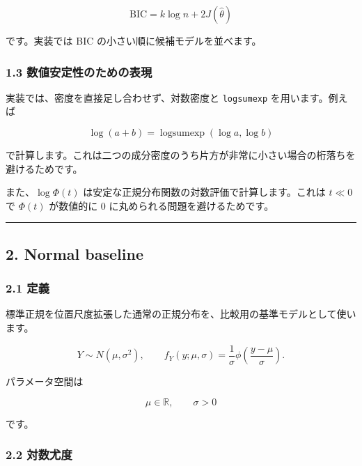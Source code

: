 \documentclass[
]{article}
\begin{document}
\[
\mathrm{BIC}=k\log n+2J(\hat\theta)
\]

です。実装では BIC の小さい順に候補モデルを並べます。

\hypertarget{ux6570ux5024ux5b89ux5b9aux6027ux306eux305fux3081ux306eux8868ux73fe}{%
\subsubsection{1.3
数値安定性のための表現}\label{ux6570ux5024ux5b89ux5b9aux6027ux306eux305fux3081ux306eux8868ux73fe}}

実装では、密度を直接足し合わせず、対数密度と \texttt{logsumexp}
を用います。例えば

\[
\log(a+b)=\operatorname{logsumexp}(\log a,\log b)
\]

で計算します。これは二つの成分密度のうち片方が非常に小さい場合の桁落ちを避けるためです。

また、\(\log\Phi(t)\) は安定な正規分布関数の対数評価で計算します。これは
\(t\ll 0\) で \(\Phi(t)\) が数値的に 0
に丸められる問題を避けるためです。

\begin{center}\rule{0.5\linewidth}{0.5pt}\end{center}

\hypertarget{normal-baseline}{%
\subsection{2. Normal baseline}\label{normal-baseline}}

\hypertarget{ux5b9aux7fa9}{%
\subsubsection{2.1 定義}\label{ux5b9aux7fa9}}

標準正規を位置尺度拡張した通常の正規分布を、比較用の基準モデルとして使います。

\[
Y\sim N(\mu,\sigma^2),
\qquad
f_Y(y;\mu,\sigma)=\frac{1}{\sigma}\phi\left(\frac{y-\mu}{\sigma}\right).
\]

パラメータ空間は

\[
\mu\in\mathbb{R},\qquad \sigma>0
\]

です。

\hypertarget{ux5bfeux6570ux5c24ux5ea6}{%
\subsubsection{2.2 対数尤度}\label{ux5bfeux6570ux5c24ux5ea6}}
\end{document}
